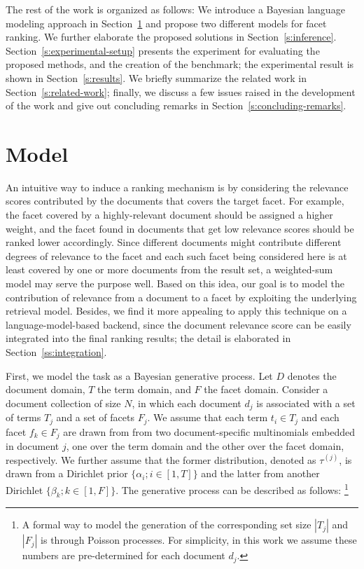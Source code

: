 The rest of the work is organized as follows: We introduce a Bayesian language
modeling approach in Section~\ref{s:model} and propose two different models for
facet ranking.  We further elaborate the proposed solutions in
Section~\ref{s:inference}.  Section~\ref{s:experimental-setup} presents the
experiment for evaluating the proposed methods, and the creation of the
benchmark; the experimental result is shown in Section~\ref{s:results}.  We
briefly summarize the related work in Section~\ref{s:related-work}; finally, we
discuss a few issues raised in the development of the work and give out
concluding remarks in Section~\ref{s:concluding-remarks}.

\section{Model}\label{s:model}

An intuitive way to induce a ranking mechanism is by considering the relevance
scores contributed by the documents that covers the target facet.  For example,
the facet covered by a highly-relevant document should be assigned a higher
weight, and the facet found in documents that get low relevance scores should
be ranked lower accordingly.  Since different documents might contribute
different degrees of relevance to the facet and each such facet being
considered here is at least covered by one or more documents from the result
set, a weighted-sum model may serve the purpose well.  Based on this idea, our
goal is to model the contribution of relevance from a document to a facet by
exploiting the underlying retrieval model.  Besides, we find it more appealing
to apply this technique on a language-model-based backend, since the document
relevance score can be easily integrated into the final ranking results; the
detail is elaborated in Section~\ref{ss:integration}.

First, we model the task as a Bayesian generative process.  Let $D$ denotes the
document domain, $T$ the term domain, and $F$ the facet domain.  Consider a
document collection of size $N$, in which each document $d_j$ is associated
with a set of terms $T_j$ and a set of facets $F_j$.  We assume that each term
$t_i \in T_j$ and each facet $f_k \in F_j$ are drawn from from two
document-specific multinomials embedded in document $j$, one over the term
domain and the other over the facet domain, respectively.  We further assume
that the former distribution, denoted as $\tau^{(j)}$, is drawn from a
Dirichlet prior $\{ \alpha_i; i \in [1, T] \}$ and the latter from another
Dirichlet $\{ \beta_k; k \in [1, F] \}$.  The generative process can be
described as follows: \footnote{A formal way to model the generation of the
corresponding set size $|T_j|$ and $|F_j|$ is through Poisson processes.  For
simplicity, in this work we assume these numbers are pre-determined for each
document $d_j$.} 

